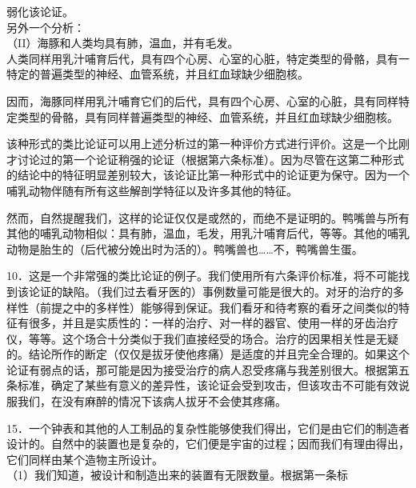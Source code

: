 弱化该论证。\\
另外一个分析：\\
（II）海豚和人类均具有肺，温血，并有毛发。\\
人类同样用乳汁哺育后代，具有四个心房、心室的心脏，特定类型的骨骼，具有一特定的普遍类型的神经、血管系统，并且红血球缺少细胞核。

因而，海豚同样用乳汁哺育它们的后代，具有四个心房、心室的心脏，具有同样特定类型的骨骼，具有同样普遍类型的神经、血管系统，并且红血球缺少细胞核。

该种形式的类比论证可以用上述分析过的第一种评价方式进行评价。这是一个比刚才讨论过的第一个论证稍强的论证（根据第六条标准）。因为尽管在这第二种形式的结论中的特征明显差别较大，该论证比第一种形式中的论证更为保守。因为一个哺乳动物伴随有所有这些解剖学特征以及许多其他的特征。

然而，自然提醒我们，这样的论证仅仅是或然的，而绝不是证明的。鸭嘴兽与所有其他的哺乳动物相似：具有肺，温血，毛发，用乳汁哺育后代，等等。其他的哺乳动物是胎生的（后代被分娩出时为活的）。鸭嘴兽也……不，鸭嘴兽生蛋。

10．这是一个非常强的类比论证的例子。我们使用所有六条评价标准，将不可能找到该论证的缺陷。（我们过去看牙医的）事例数量可能是很大的。对牙的治疗的多样性（前提之中的多样性）能够得到保证。我们看牙和待考察的看牙之间类似的特征有很多，并且是实质性的：一样的治疗、对一样的器官、使用一样的牙齿治疗仪，等等。这个场合十分类似于我们直接经受的场合。治疗的因果相关性是无疑的。结论所作的断定（仅仅是拔牙使他疼痛）是适度的并且完全合理的。如果这个论证有弱点的话，那可能是因为接受治疗的病人忍受疼痛与我差别很大。根据第五条标准，确定了某些有意义的差异性，该论证会受到攻击，但该攻击不可能有效说服我们，在没有麻醉的情况下该病人拔牙不会使其疼痛。

15．一个钟表和其他的人工制品的复杂性能够使我们得出，它们是由它们的制造者设计的。自然中的装置也是复杂的，它们便是宇宙的过程；因而我们有理由得出，它们同样由某个造物主所设计。\\
（1）我们知道，被设计和制造出来的装置有无限数量。根据第一条标

